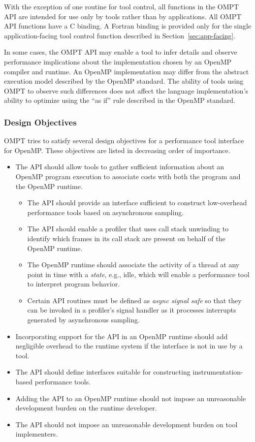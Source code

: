 \documentclass{article}
\begin{document}
With the exception of one routine for tool control, all functions in the OMPT API are intended for use only by tools rather than by applications. All OMPT API functions  have a C binding. A Fortran binding is  provided only for the single application-facing tool control function described in Section~\ref{sec:app-facing}.

In some cases, the OMPT API may enable a tool to infer details and observe performance implications about the implementation chosen by an OpenMP compiler and runtime. An OpenMP implementation may differ from the abstract execution model described by the OpenMP standard. The ability of tools using OMPT  to observe such differences does not affect the language implementation's ability to optimize using the ``as if'' rule described in the OpenMP standard.

\subsubsection{Design Objectives}
OMPT tries to satisfy several design objectives for a performance tool interface for OpenMP. These objectives are listed in decreasing order of importance.
\begin{itemize}
\item The API should allow tools to gather sufficient information about an OpenMP program execution to associate costs with both the program and the OpenMP runtime.
\begin{itemize}
\item The API should provide an interface sufficient to construct low-overhead performance tools based on asynchronous sampling.
\item The API should enable a profiler that uses call stack unwinding to identify which frames in its call stack are present on behalf of the OpenMP runtime.
\item The OpenMP runtime should associate the activity of a thread at any point in time with a {\em state}, e.g., idle, which will enable a performance tool to interpret program behavior.  
\item Certain API routines must be defined as {\em async signal safe} so that they can be invoked in a profiler's signal handler as it processes interrupts generated by asynchronous sampling.
\end{itemize}
\item Incorporating support for the  API in an OpenMP runtime should add negligible overhead to the runtime system if the interface is not in use by a tool.
\item The API should define interfaces suitable for constructing  instrumentation-based performance tools.
\item Adding the API to an OpenMP runtime should not impose an unreasonable development burden on the runtime developer.
\item The API should not impose an unreasonable development burden on tool implementers.
\end{itemize}
\end{document}
